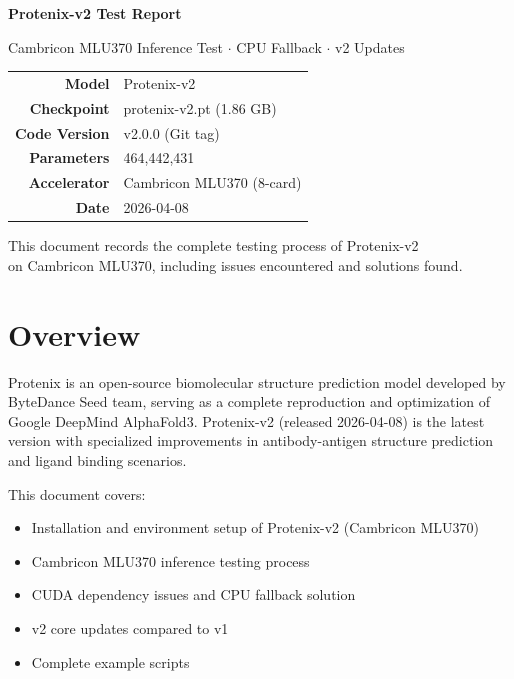 \documentclass[12pt,a4paper]{article}
\begin{document}
\begin{titlepage}
    \centering
    \vspace*{2cm}

    {\Huge\bfseries Protenix-v2 Test Report\par}
    \vspace{1cm}
    {\Large Cambricon MLU370 Inference Test $\cdot$ CPU Fallback $\cdot$ v2 Updates\par}
    \vspace{2cm}

    \begin{tabular}{rl}
        \textbf{Model}    & Protenix-v2 \\
        \textbf{Checkpoint} & protenix-v2.pt (1.86 GB) \\
        \textbf{Code Version} & v2.0.0 (Git tag) \\
        \textbf{Parameters}   & 464,442,431 \\
        \textbf{Accelerator}  & Cambricon MLU370 (8-card) \\
        \textbf{Date} & 2026-04-08
    \end{tabular}

    \vfill
    {\large This document records the complete testing process of Protenix-v2\\
           on Cambricon MLU370, including issues encountered and solutions found.\par}
\end{titlepage}

\clearpage
\tableofcontents
\clearpage

\section{Overview}

Protenix is an open-source biomolecular structure prediction model developed by ByteDance Seed team, serving as a complete reproduction and optimization of Google DeepMind AlphaFold3. Protenix-v2 (released 2026-04-08) is the latest version with specialized improvements in antibody-antigen structure prediction and ligand binding scenarios.

This document covers:
\begin{itemize}
    \item Installation and environment setup of Protenix-v2 (Cambricon MLU370)
    \item Cambricon MLU370 inference testing process
    \item CUDA dependency issues and CPU fallback solution
    \item v2 core updates compared to v1
    \item Complete example scripts
\end{itemize}
\end{document}
